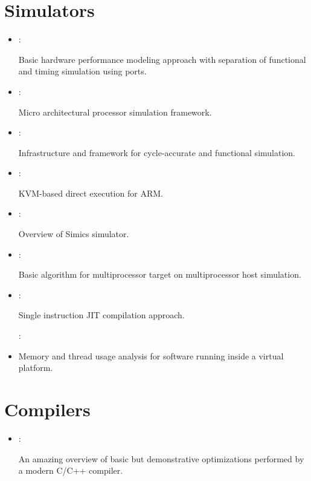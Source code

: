 \section*{Simulators}
\begin{itemize}
    \item \cite{Emer:Asim:2002}:

    Basic hardware performance modeling approach with separation of functional and timing simulation using ports.

    \item \cite{Hughes:Rsim:2002}:

    Micro architectural processor simulation framework.

    \item \cite{Austin:SimpleScalar:2002}:

    Infrastructure and framework for cycle-accurate and functional simulation.

    \item \cite{Junger:ARM-on-ARM:2020}:

    KVM-based direct execution for ARM.

    \item \cite{Magnusson:Simics:2002}:

    Overview of Simics simulator.

    \item \cite{Kenney:MP-on-MP:2015}:

    Basic algorithm for multiprocessor target on multiprocessor host simulation.

    \item \cite{Nohl:JIT-Simulation:2002}:

    Single instruction JIT compilation approach.

    \cite{Dahl:VP-Sanitizer:2018}:

    \item Memory and thread usage analysis for software running inside a virtual platform.
\end{itemize}

\section*{Compilers}
\begin{itemize}
    \item \cite{Godbolt:Optimizations:2020}:

    An amazing overview of basic but demonstrative optimizations performed by a modern C/C++ compiler.    
\end{itemize}

